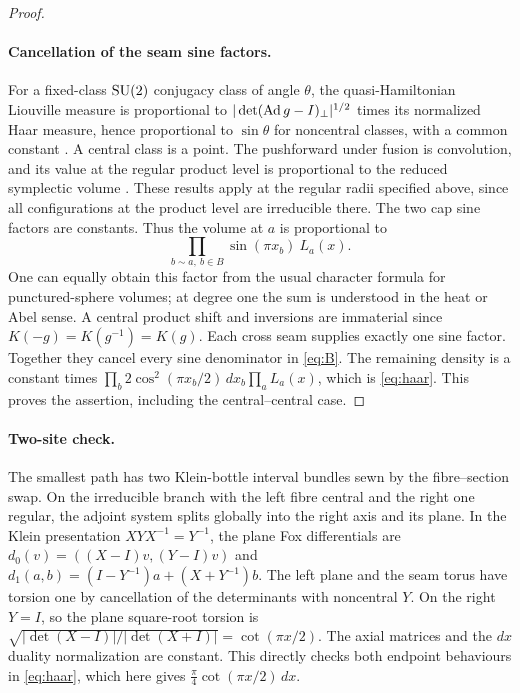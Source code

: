\begin{proof}
\paragraph{Cancellation of the seam sine factors.}
For a fixed-class \(\mathrm{SU}(2)\) conjugacy class of angle \(\theta\), the quasi-Hamiltonian Liouville measure is proportional to \(|\det(\operatorname{Ad} g-I)_{\perp}|^{1/2}\) times its normalized Haar measure, hence proportional to \(\sin\theta\) for noncentral classes, with a common constant \cite[Prop.~3.6]{AMW}. A central class is a point. The pushforward under fusion is convolution, and its value at the regular product level is proportional to the reduced symplectic volume \cite[\S5.1]{AMW}. These results apply at the regular radii specified above, since all configurations at the product level are irreducible there. The two cap sine factors are constants. Thus the volume at \(a\) is proportional to
\[
 \prod_{b\sim a,\ b\in B}\sin(\pi x_b)\ L_a(x).
\]
One can equally obtain this factor from the usual character formula for punctured-sphere volumes; at degree one the sum is understood in the heat or Abel sense. A central product shift and inversions are immaterial since \(K(-g)=K(g^{-1})=K(g)\). Each cross seam supplies exactly one sine factor. Together they cancel every sine denominator in \eqref{eq:B}. The remaining density is a constant times \(\prod_b2\cos^2(\pi x_b/2)\,dx_b\prod_aL_a(x)\), which is \eqref{eq:haar}. This proves the assertion, including the central--central case.
\end{proof}

\paragraph{Two-site check.}
The smallest path has two Klein-bottle interval bundles sewn by the fibre--section swap. On the irreducible branch with the left fibre central and the right one regular, the adjoint system splits globally into the right axis and its plane. In the Klein presentation \(XYX^{-1}=Y^{-1}\), the plane Fox differentials are \(d_0(v)=((X-I)v,(Y-I)v)\) and \(d_1(a,b)=(I-Y^{-1})a+(X+Y^{-1})b\). The left plane and the seam torus have torsion one by cancellation of the determinants with noncentral \(Y\). On the right \(Y=I\), so the plane square-root torsion is \(\sqrt{|\det(X-I)|/|\det(X+I)|}=\cot(\pi x/2)\). The axial matrices and the \(dx\) duality normalization are constant. This directly checks both endpoint behaviours in \eqref{eq:haar}, which here gives \(\frac{\pi}{4}\cot(\pi x/2)\,dx\).
